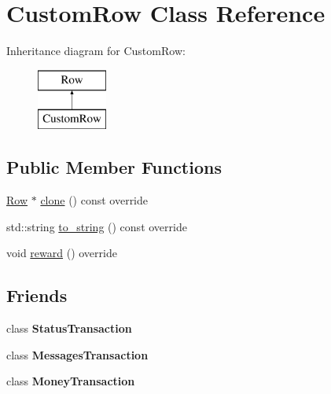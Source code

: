 \hypertarget{classCustomRow}{}\section{Custom\+Row Class Reference}
\label{classCustomRow}
Inheritance diagram for Custom\+Row\+:\begin{figure}[H]
\begin{center}
\leavevmode
\includegraphics[height=2.000000cm]{classCustomRow}
\end{center}
\end{figure}
\subsection*{Public Member Functions}
\begin{DoxyCompactItemize}
\item 
\mbox{\hyperlink{classRow}{Row}} $\ast$ \mbox{\hyperlink{classCustomRow_a9d3c1b6bda5e63de382cc4a2aa29210d}{clone}} () const override
\item 
std\+::string \mbox{\hyperlink{classCustomRow_ae1e5a3b861829f8b295d3c743d6b3c7a}{to\+\_\+string}} () const override
\item 
void \mbox{\hyperlink{classCustomRow_a007002dc965ca2727ec8db0183404bf1}{reward}} () override
\end{DoxyCompactItemize}
\subsection*{Friends}
\begin{DoxyCompactItemize}
\item 
\mbox{\label{classCustomRow_a981e309965953ac0b11a1d0e611ff665}} 
class {\bfseries Status\+Transaction}
\item 
\mbox{\label{classCustomRow_aadda0b308cea8af7e493a972ceadc46d}} 
class {\bfseries Messages\+Transaction}
\item 
\mbox{\label{classCustomRow_aef619c16e7adc66eea065c1103177804}} 
class {\bfseries Money\+Transaction}
\end{DoxyCompactItemize}


